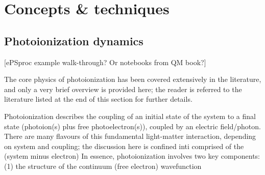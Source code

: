 \section{Concepts \& techniques}

\subsection{Photoionization dynamics} 
[ePSproc example walk-through? Or notebooks from QM book?]

The core physics of photoionization has been covered extensively in the literature, and only a very brief overview is provided here; the reader is referred to the literature listed at the end of this section for further details.

Photoionization describes the coupling of an initial state of the system to a final state (photoion(s) plus free photoelectron(s)), coupled by an electric field/photon. There are many flavours of this fundamental light-matter interaction, depending on system and coupling; the discussion here is confined inti
comprised of the (system minus electron)  In essence, photoionization involves two key components: (1) the structure of the continuum (free electron) wavefunction 